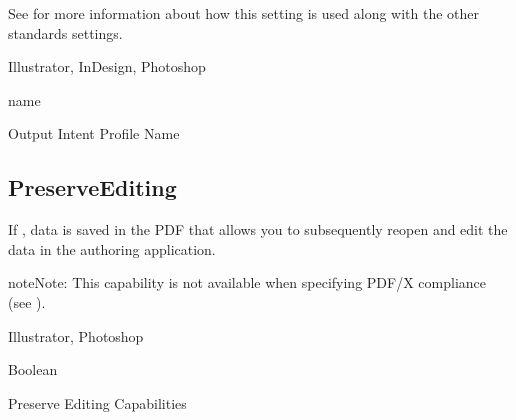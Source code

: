 \documentclass[letterpaper,12pt,english,openany,oneside]{sphinxmanual}
\begin{document}
See  for more information about how this setting is used along with the other standards settings.

\label{\detokenize{PDF_Create_NewNamespaces:supported-by-22}}

Illustrator, InDesign, Photoshop

\label{\detokenize{PDF_Create_NewNamespaces:type-22}}

name

\label{\detokenize{PDF_Create_NewNamespaces:ui-name-22}}

Output Intent Profile Name

\label{\detokenize{PDF_Create_NewNamespaces:default-value-21}}

\begin{sphinxVerbatim}[commandchars=\\\{\}]
\end{sphinxVerbatim}


\subsection{PreserveEditing}
\label{\detokenize{PDF_Create_NewNamespaces:preserveediting}}
If  , data is saved in the PDF that allows you to subsequently re\sphinxhyphen{}open and edit the data in the authoring application.

\begin{sphinxadmonition}{note}{Note:}
This capability is not available when specifying PDF/X compliance (see ).
\end{sphinxadmonition}
\label{\detokenize{PDF_Create_NewNamespaces:supported-by-23}}

Illustrator, Photoshop

\label{\detokenize{PDF_Create_NewNamespaces:type-23}}

Boolean

\label{\detokenize{PDF_Create_NewNamespaces:ui-name-23}}

Preserve  Editing Capabilities
\end{document}
